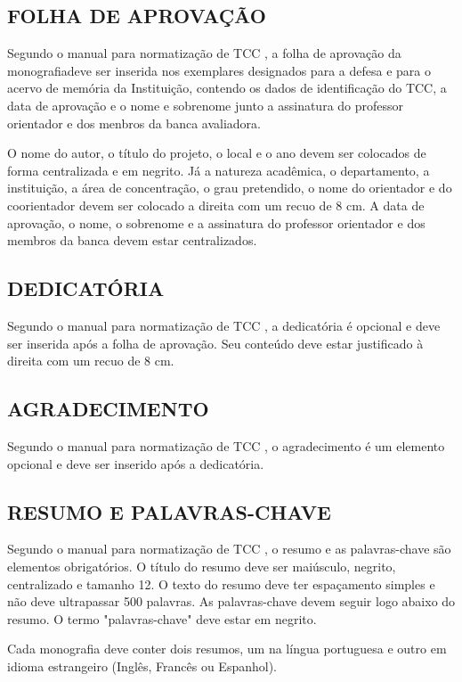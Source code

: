 \subsection{FOLHA DE APROVAÇÃO}
Segundo o manual para normatização de TCC \cite{manualTCC}, a folha de aprovação da monografiadeve ser inserida nos exemplares designados para a defesa e para o acervo de memória da Instituição, contendo os dados de identificação do TCC, a data de aprovação e o nome e sobrenome junto a assinatura do professor orientador e dos menbros da banca avaliadora. 

O nome do autor, o título do projeto, o local e o ano devem ser colocados de forma centralizada e em negrito. Já a natureza acadêmica, o departamento, a instituição, a área de concentração, o grau pretendido, o nome do orientador e do coorientador devem ser colocado a direita com um recuo de 8 cm. A data de aprovação, o nome, o sobrenome e a assinatura do professor orientador e dos membros da banca devem estar centralizados.

\subsection{DEDICATÓRIA}
Segundo o manual para normatização de TCC \cite{manualTCC}, a dedicatória é opcional e deve ser inserida após a folha de aprovação. Seu conteúdo deve estar justificado à direita com um recuo de 8 cm.

\subsection{AGRADECIMENTO}
Segundo o manual para normatização de TCC \cite{manualTCC}, o agradecimento é um elemento opcional e deve ser inserido após a dedicatória.

\subsection{RESUMO E PALAVRAS-CHAVE}
Segundo o manual para normatização de TCC \cite{manualTCC}, o resumo e as palavras-chave são elementos obrigatórios. O título do resumo deve ser maiúsculo, negrito, centralizado e tamanho 12. O texto do resumo deve ter espaçamento simples e não deve ultrapassar 500 palavras. As palavras-chave devem seguir logo abaixo do resumo. O termo "palavras-chave" deve estar em negrito.

Cada monografia deve conter dois resumos, um na língua portuguesa e outro em idioma estrangeiro (Inglês, Francês ou Espanhol). 

